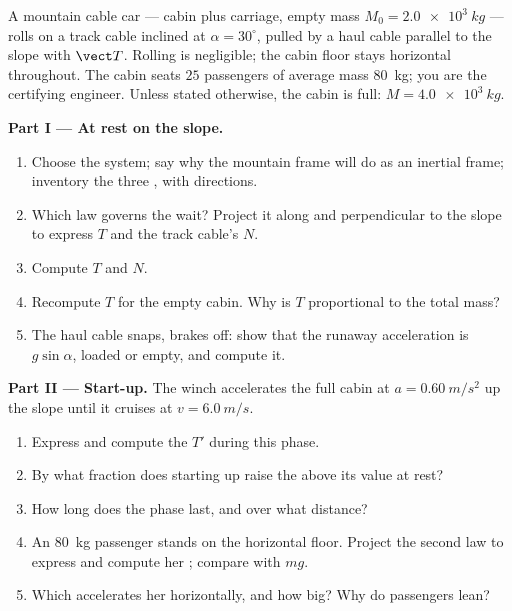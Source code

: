 \begin{problem}
\label{pb:g12:newtons-laws:1}
A mountain cable car --- cabin plus carriage, empty mass $M_0 = \qty{2.0e3}{kg}$ ---
rolls on a track cable inclined at $\alpha = 30^\circ$, pulled by a haul cable
parallel to the slope with  $\vect T$. Rolling  is negligible; the
cabin floor stays horizontal throughout. The cabin seats $25$ passengers of average
mass \qty{80}{kg}; you are the certifying engineer. Unless stated otherwise, the
cabin is full: $M = \qty{4.0e3}{kg}$.

\medskip
\noindent\textbf{Part I --- At rest on the slope.}
\begin{enumerate}
  \item Choose the system; say why the mountain frame will do as an inertial frame;
        inventory the three , with directions.
  \item Which law governs the wait? Project it along and perpendicular to the slope
        to express $T$ and the track cable's  $N$.
  \item Compute $T$ and $N$.
  \item Recompute $T$ for the empty cabin. Why is $T$ proportional to the total mass?
  \item The haul cable snaps, brakes off: show that the runaway acceleration is
        $g \sin\alpha$, loaded or empty, and compute it.
\end{enumerate}

\medskip
\noindent\textbf{Part II --- Start-up.} The winch accelerates the full cabin at
$a = \qty{0.60}{m/s^2}$ up the slope until it cruises at $v = \qty{6.0}{m/s}$.
\begin{enumerate}[resume]
  \item Express and compute the  $T'$ during this phase.
  \item By what fraction does starting up raise the  above its value at rest?
  \item How long does the phase last, and over what distance?
  \item An \qty{80}{kg} passenger stands on the horizontal floor. Project the second
        law  to express and compute her ; compare with $mg$.
  \item Which  accelerates her horizontally, and how big? Why do passengers lean?
\end{enumerate}


\end{problem}
